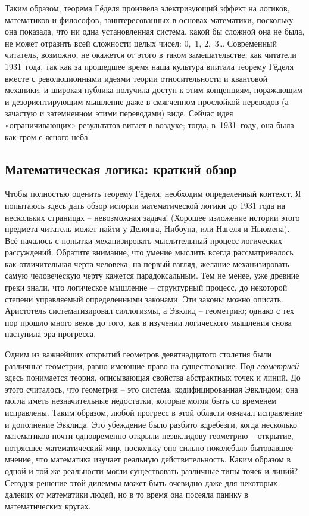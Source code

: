 \documentclass[../main.tex]{subfiles}
\begin{document}
Таким образом, теорема Гёделя произвела электризующий эффект на логиков, математиков и философов, заинтересованных в основах математики, поскольку она показала, что ни одна установленная система, какой бы сложной она не была, не может отразить всей сложности целых чисел: 0,~1, 2,~3\ldots{} Современный читатель, возможно, не окажется от этого в таком замешательстве, как читатели 1931~года, так как за прошедшее время наша культура впитала теорему Гёделя вместе с революционными идеями теории относительности и квантовой механики, и широкая публика получила доступ к этим концепциям, поражающим и дезориентирующим мышление даже в смягченном прослойкой переводов (а зачастую и затемненном этими переводами) виде. Сейчас идея «ограничивающих» результатов витает в воздухе; тогда, в~1931~году, она была как гром с ясного неба.


\subsection{Математическая логика: краткий обзор}

Чтобы полностью оценить теорему Гёделя, необходим определенный контекст. Я попытаюсь здесь дать обзор истории математической логики до 1931 года на нескольких страницах \--- невозможная задача! (Хорошее изложение истории этого предмета читатель может найти у Делонга, Нибоуна, или Нагеля и Ньюмена). Всё началось с попытки механизировать мыслительный процесс логических рассуждений. Обратите внимание, что умение мыслить всегда рассматривалось как отличительная черта человека; на первый взгляд, желание механизировать самую человеческую черту кажется парадоксальным. Тем не менее, уже древние греки знали, что логическое мышление \--- структурный процесс, до некоторой степени управляемый определенными законами. Эти законы можно описать. Аристотель систематизировал силлогизмы, а Эвклид \--- геометрию; однако с тех пор прошло много веков до того, как в изучении логического мышления снова наступила эра прогресса.

Одним из важнейших открытий геометров девятнадцатого столетия были различные геометрии, равно имеющие право на существование. Под \emph{геометрией} здесь понимается теория, описывающая свойства абстрактных точек и линий. До этого считалось, что геометрия \--- это система, кодифицированная Эвклидом; она могла иметь незначительные недостатки, которые могли быть со временем исправлены. Таким образом, любой прогресс в этой области означал исправление и дополнение Эвклида. Это убеждение было разбито вдребезги, когда несколько математиков почти одновременно открыли неэвклидову геометрию \--- открытие, потрясшее математический мир, поскольку оно сильно поколебало бытовавшее мнение, что математика изучает реальную действительность. Каким образом в одной и той же реальности могли существовать различные типы точек и линий? Сегодня решение этой дилеммы может быть очевидно даже для некоторых далеких от математики людей, но в то время она посеяла панику в математических кругах.
\end{document}
